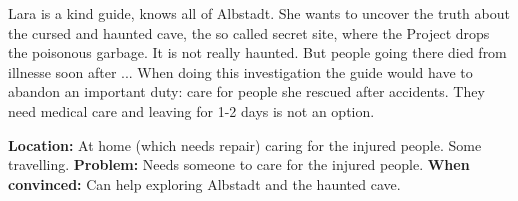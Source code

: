 \begin{npcBox}[title=Lara]
    \begin{consequences}
    \item {}
    \item {}
    \item {}
    \end{consequences}

    \begin{npcDescription}
    Lara is a kind guide, knows all of Albstadt. She wants to uncover the truth about the cursed and haunted cave, the so called secret site, where the Project drops the poisonous garbage. It is not really haunted. But people going there died from illnesse soon after ...
    When doing this investigation the guide would have to abandon an important duty: care for people she rescued after accidents. They need medical care and leaving for 1-2 days is not an option.

    \textbf{Location:} At home (which needs repair) caring for the injured people. Some travelling.
    \textbf{Problem:} Needs someone to care for the injured people.
    \textbf{When convinced:} Can help exploring Albstadt and the haunted cave.
    \end{npcDescription}

\end{npcBox}

\newpage

